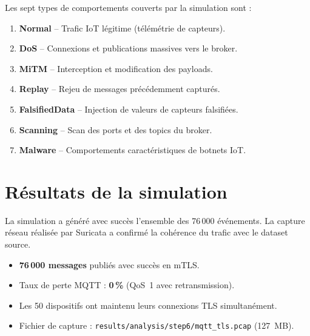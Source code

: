 Les sept types de comportements couverts par la simulation sont :
\begin{enumerate}
  \item \textbf{Normal} -- Trafic IoT légitime (télémétrie de capteurs).
  \item \textbf{DoS} -- Connexions et publications massives vers le broker.
  \item \textbf{MiTM} -- Interception et modification des payloads.
  \item \textbf{Replay} -- Rejeu de messages précédemment capturés.
  \item \textbf{FalsifiedData} -- Injection de valeurs de capteurs falsifiées.
  \item \textbf{Scanning} -- Scan des ports et des topics du broker.
  \item \textbf{Malware} -- Comportements caractéristiques de botnets IoT.
\end{enumerate}

\section{Résultats de la simulation}

La simulation a généré avec succès l'ensemble des 76\,000 événements. La capture réseau réalisée par Suricata a confirmé la cohérence du trafic avec le dataset source.

\begin{resultbox}
\begin{itemize}
  \item \textbf{76\,000 messages} publiés avec succès en mTLS.
  \item Taux de perte MQTT : \textbf{0\,\%} (QoS~1 avec retransmission).
  \item Les 50 dispositifs ont maintenu leurs connexions TLS simultanément.
  \item Fichier de capture : \texttt{results/analysis/step6/mqtt\_tls.pcap} (127~MB).
\end{itemize}
\end{resultbox}
